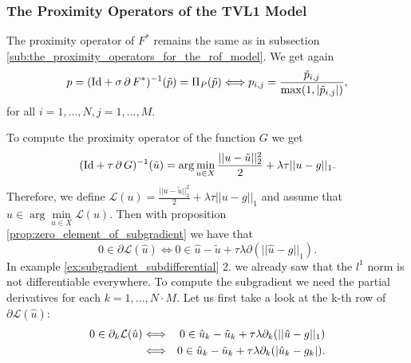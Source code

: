 
    \subsubsection{The Proximity Operators of the TVL1 Model} %
    \label{ssub:the_proximity_operators_of_the_tvl1_model}
        
        The proximity operator of $F^{\ast}$ remains the same as in subsection \ref{sub:the_proximity_operators_for_the_rof_model}. We get again
            \begin{equation}
                p = (\textnormal{Id} + \sigma\,\partial\,F^{\ast})^{-1}(\tilde{p}) = \Pi_{P}(\tilde{p}) \Longleftrightarrow p_{i,j} = \frac{\tilde{p}_{i, j}}{\max(1, |\tilde{p}_{i, j}|)},
            \label{eq:proximity_operator_f_star_tvl1}
            \end{equation}
        for all $i = 1, ..., N, j = 1, ..., M$.

        To compute the proximity operator of the function $G$ we get
            $$
                (\textnormal{Id} + \tau\,\partial\,G)^{-1}(\tilde{u}) = \arg \min_{u \in X} \frac{||u - \tilde{u}||_{2}^{2}}{2} + \lambda\tau||u - g||_{1}.
            $$
        Therefore, we define $\mathcal{L}(u) = \frac{||u - \tilde{u}||_{2}^{2}}{2} + \lambda\tau||u - g||_{1}$ and assume that $\hat{u} \in \arg \min\limits_{u \in X} \mathcal{L}(u)$. Then with proposition \ref{prop:zero_element_of_subgradient} we have that
            $$
                0 \in \partial \mathcal{L}(\hat{u}) \Longleftrightarrow 0 \in \hat{u} - \tilde{u} + \tau\lambda \partial(||\hat{u} - g||_{1}).
            $$
        In example \ref{ex:subgradient_subdifferential} 2. we already saw that the $l^{1}$ norm is not differentiable everywhere. To compute the subgradient we need the partial derivatives for each $k = 1, ..., N \cdot M$. Let us first take a look at the k-th row of $\partial\mathcal{L}(\hat{u})$:
            \begin{eqnarray}
                0 \in \partial_{k} \mathcal{L}(\hat{u}) &\Longleftrightarrow& 0 \in \hat{u}_{k} - \tilde{u}_{k} + \tau\lambda \partial_{k}(||\hat{u} - g||_{1}) \notag \\
                &\Longleftrightarrow& 0 \in \hat{u}_{k} - \tilde{u}_{k} + \tau\lambda \partial_{k} (|\hat{u}_{k} - g_{k}|). \notag
            \end{eqnarray}

